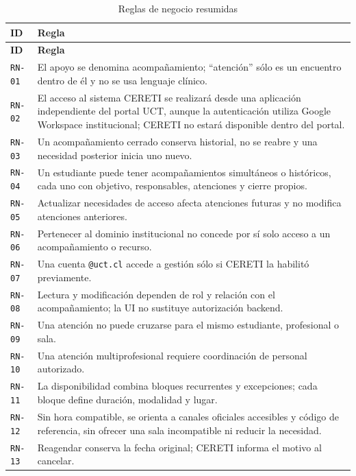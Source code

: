 \documentclass[10pt,a4paper,oneside]{article}
\newcommand{\id}[1]{\texttt{#1}}
\begin{document}
\scriptsize
\renewcommand{\arraystretch}{1.1}
\begin{longtable}{@{}L{0.065\textwidth}L{0.92\textwidth}@{}}
\caption{Reglas de negocio resumidas}\label{tab:rn-sintesis}\\
\toprule\textbf{ID} & \textbf{Regla}\\\midrule
\endfirsthead\toprule\textbf{ID} & \textbf{Regla}\\\midrule\endhead
\bottomrule\endfoot
\id{RN-01} & El apoyo se denomina acompañamiento; ``atención'' sólo es un encuentro dentro de él y no se usa lenguaje clínico.\\
\id{RN-02} & El acceso al sistema CERETI se realizará desde una aplicación independiente del portal UCT, aunque la autenticación utiliza Google Workspace institucional; CERETI no estará disponible dentro del portal.\\
\id{RN-03} & Un acompañamiento cerrado conserva historial, no se reabre y una necesidad posterior inicia uno nuevo.\\
\id{RN-04} & Un estudiante puede tener acompañamientos simultáneos o históricos, cada uno con objetivo, responsables, atenciones y cierre propios.\\
\id{RN-05} & Actualizar necesidades de acceso afecta atenciones futuras y no modifica atenciones anteriores.\\
\id{RN-06} & Pertenecer al dominio institucional no concede por sí solo acceso a un acompañamiento o recurso.\\
\id{RN-07} & Una cuenta \texttt{@uct.cl} accede a gestión sólo si CERETI la habilitó previamente.\\
\id{RN-08} & Lectura y modificación dependen de rol y relación con el acompañamiento; la UI no sustituye autorización backend.\\
\id{RN-09} & Una atención no puede cruzarse para el mismo estudiante, profesional o sala.\\
\id{RN-10} & Una atención multiprofesional requiere coordinación de personal autorizado.\\
\id{RN-11} & La disponibilidad combina bloques recurrentes y excepciones; cada bloque define duración, modalidad y lugar.\\
\id{RN-12} & Sin hora compatible, se orienta a canales oficiales accesibles y código de referencia, sin ofrecer una sala incompatible ni reducir la necesidad.\\
\id{RN-13} & Reagendar conserva la fecha original; CERETI informa el motivo al cancelar.\\

\end{longtable}
\end{document}
